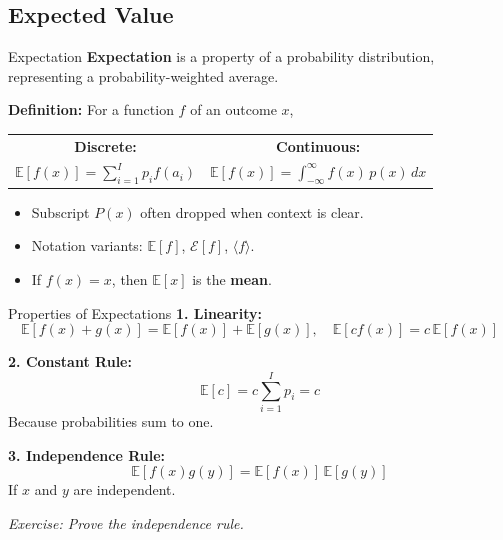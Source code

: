\documentclass{beamer}
\begin{document}
\subsection{Expected Value}
\begin{frame}{Expectation}
\textbf{Expectation} is a property of a probability distribution, representing a probability-weighted average.

\vspace{1em}
\textbf{Definition:} For a function $f$ of an outcome $x$,

\begin{center}
\begin{tabular}{cc}
\textbf{Discrete:} & \textbf{Continuous:} \\
$\displaystyle \mathbb{E}[f(x)] = \sum_{i=1}^{I} p_i f(a_i)$ &
$\displaystyle \mathbb{E}[f(x)] = \int_{-\infty}^{\infty} f(x) \, p(x) \, dx$
\end{tabular}
\end{center}

\vspace{1em}
\begin{itemize}
  \item Subscript $P(x)$ often dropped when context is clear.
  \item Notation variants: $\mathbb{E}[f]$, $\mathcal{E}[f]$, $\langle f \rangle$.
  \item If $f(x) = x$, then $\mathbb{E}[x]$ is the \textbf{mean}.
\end{itemize}
\end{frame}


\begin{frame}{Properties of Expectations}
\textbf{1. Linearity:}
\[
\mathbb{E}[f(x) + g(x)] = \mathbb{E}[f(x)] + \mathbb{E}[g(x)], \quad
\mathbb{E}[c f(x)] = c \, \mathbb{E}[f(x)]
\]

\textbf{2. Constant Rule:}
\[
\mathbb{E}[c] = c \sum_{i=1}^{I} p_i = c
\]
Because probabilities sum to one.

\textbf{3. Independence Rule:}
\[
\mathbb{E}[f(x) g(y)] = \mathbb{E}[f(x)] \, \mathbb{E}[g(y)]
\]
If $x$ and $y$ are independent.

\vspace{1em}
\textit{Exercise: Prove the independence rule.}
\end{frame}
\end{document}
